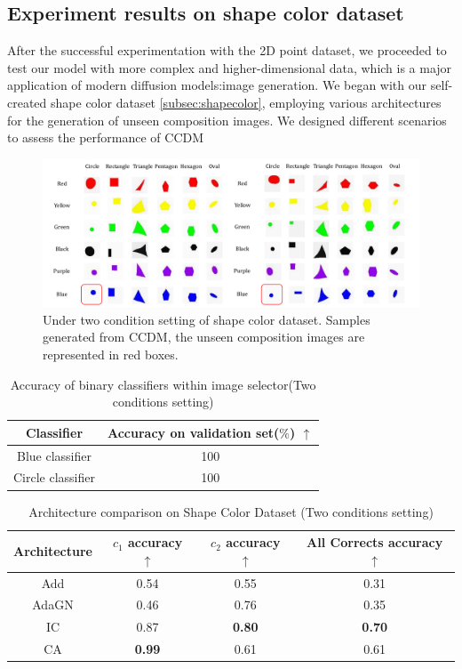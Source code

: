\subsection{Experiment results on shape color dataset}
After the successful experimentation with the 2D point dataset, we proceeded to test our model with more complex and higher-dimensional data, which is a major application of modern diffusion models:image generation. We began with our self-created shape color dataset \ref{subsec:shapecolor}, employing various architectures for the generation of unseen composition images. We designed different scenarios to assess the performance of CCDM

\begin{figure} [H]
    \centering
    \includegraphics[width=1\linewidth]{figures/ShapeColor1.pdf}
    \caption{Under two condition setting of shape color dataset. Samples generated from CCDM, the unseen composition images are represented in red boxes.}
    \label{fig:sample_1}
\end{figure}

\begin{table} [H]
    \centering
    \begin{tabular}{cc}
         Classifier & Accuracy on validation set($\%$) $\uparrow$ \\
         \hline
         Blue classifier & 100 \\
         Circle classifier & 100 \\
         
    \end{tabular}
    \caption{Accuracy of binary classifiers within image selector(Two conditions setting)}
    \label{ShapeColorBinAcc}
\end{table}

\begin{table} [H]
    \centering
    \begin{tabular}{cccc}
         Architecture & $c_1$ accuracy $\uparrow$ & $c_2$ accuracy $\uparrow$ & All Corrects accuracy $\uparrow$ \\
         \hline
         Add & 0.54 & 0.55 & 0.31\\
         AdaGN & 0.46 & 0.76 & 0.35\\
         IC & 0.87 & \textbf{0.80} & \textbf{0.70}\\
         CA & \textbf{0.99} & 0.61 & 0.61\\
    \end{tabular}
    \caption{Architecture comparison on Shape Color Dataset (Two conditions setting)}
    \label{ShapeColorAcc}
\end{table}



